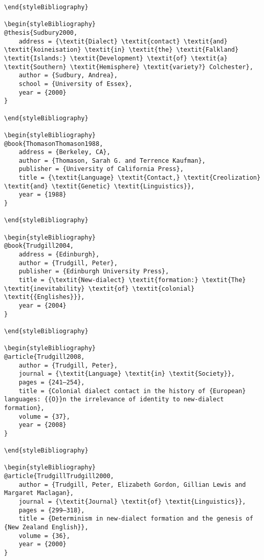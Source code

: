 \documentclass[output=paper]{langsci/langscibook}
\begin{document}
\begin{verbatim}
\end{styleBibliography}

\begin{styleBibliography}
@thesis{Sudbury2000,
	address = {\textit{Dialect} \textit{contact} \textit{and} \textit{koineisation} \textit{in} \textit{the} \textit{Falkland} \textit{Islands:} \textit{Development} \textit{of} \textit{a} \textit{Southern} \textit{Hemisphere} \textit{variety?} Colchester},
	author = {Sudbury, Andrea},
	school = {University of Essex},
	year = {2000}
}

\end{styleBibliography}

\begin{styleBibliography}
@book{ThomasonThomason1988,
	address = {Berkeley, CA},
	author = {Thomason, Sarah G. and Terrence Kaufman},
	publisher = {University of California Press},
	title = {\textit{Language} \textit{Contact,} \textit{Creolization} \textit{and} \textit{Genetic} \textit{Linguistics}},
	year = {1988}
}

\end{styleBibliography}

\begin{styleBibliography}
@book{Trudgill2004,
	address = {Edinburgh},
	author = {Trudgill, Peter},
	publisher = {Edinburgh University Press},
	title = {\textit{New-dialect} \textit{formation:} \textit{The} \textit{inevitability} \textit{of} \textit{colonial} \textit{{Englishes}}},
	year = {2004}
}

\end{styleBibliography}

\begin{styleBibliography}
@article{Trudgill2008,
	author = {Trudgill, Peter},
	journal = {\textit{Language} \textit{in} \textit{Society}},
	pages = {241–254},
	title = {Colonial dialect contact in the history of {European} languages: {{O}}n the irrelevance of identity to new-dialect formation},
	volume = {37},
	year = {2008}
}

\end{styleBibliography}

\begin{styleBibliography}
@article{TrudgillTrudgill2000,
	author = {Trudgill, Peter, Elizabeth Gordon, Gillian Lewis and Margaret Maclagan},
	journal = {\textit{Journal} \textit{of} \textit{Linguistics}},
	pages = {299–318},
	title = {Determinism in new-dialect formation and the genesis of {New Zealand English}},
	volume = {36},
	year = {2000}
}


\end{verbatim}
\end{document}
